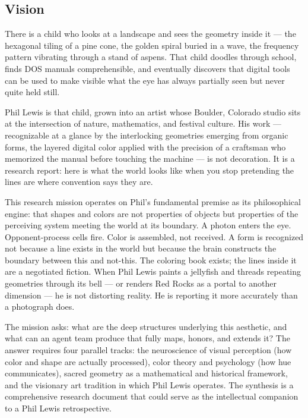 \documentclass[11pt,letterpaper]{article}
\begin{document}
\subsection{Vision}

There is a child who looks at a landscape and sees the geometry inside it --- the hexagonal tiling of a pine cone, the golden spiral buried in a wave, the frequency pattern vibrating through a stand of aspens. That child doodles through school, finds DOS manuals comprehensible, and eventually discovers that digital tools can be used to make visible what the eye has always partially seen but never quite held still.

Phil Lewis is that child, grown into an artist whose Boulder, Colorado studio sits at the intersection of nature, mathematics, and festival culture. His work --- recognizable at a glance by the interlocking geometries emerging from organic forms, the layered digital color applied with the precision of a craftsman who memorized the manual before touching the machine --- is not decoration. It is a research report: here is what the world looks like when you stop pretending the lines are where convention says they are.

This research mission operates on Phil's fundamental premise as its philosophical engine: that shapes and colors are not properties of objects but properties of the perceiving system meeting the world at its boundary. A photon enters the eye. Opponent-process cells fire. Color is assembled, not received. A form is recognized not because a line exists in the world but because the brain constructs the boundary between this and not-this. The coloring book exists; the lines inside it are a negotiated fiction. When Phil Lewis paints a jellyfish and threads repeating geometries through its bell --- or renders Red Rocks as a portal to another dimension --- he is not distorting reality. He is reporting it more accurately than a photograph does.

The mission asks: what are the deep structures underlying this aesthetic, and what can an agent team produce that fully maps, honors, and extends it? The answer requires four parallel tracks: the neuroscience of visual perception (how color and shape are actually processed), color theory and psychology (how hue communicates), sacred geometry as a mathematical and historical framework, and the visionary art tradition in which Phil Lewis operates. The synthesis is a comprehensive research document that could serve as the intellectual companion to a Phil Lewis retrospective.
\end{document}
